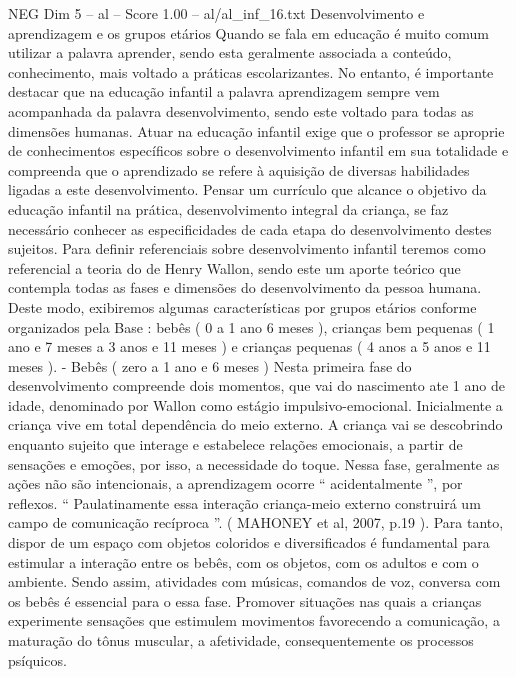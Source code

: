 \begin{textsample}{NEG Dim 5 – al – Score 1.00 – al/al\_inf\_16.txt}  \label{ex:f5_neg_249}
Desenvolvimento e aprendizagem e os grupos etários Quando se fala em educação é muito comum utilizar a palavra aprender, sendo esta geralmente associada a conteúdo, conhecimento, mais voltado a práticas escolarizantes.
No entanto, é importante destacar que na educação infantil a palavra aprendizagem sempre vem acompanhada da palavra desenvolvimento, sendo este voltado para todas as dimensões humanas.
Atuar na educação infantil exige que o professor se aproprie de conhecimentos específicos sobre o desenvolvimento infantil em sua totalidade e compreenda que o aprendizado se refere à aquisição de diversas habilidades ligadas a este desenvolvimento.
Pensar um currículo que alcance o objetivo da educação infantil na prática, desenvolvimento integral da criança, se faz necessário conhecer as especificidades de cada etapa do desenvolvimento destes sujeitos.
Para definir referenciais sobre desenvolvimento infantil teremos como referencial a teoria do de Henry Wallon, sendo este um aporte teórico que contempla todas as fases e dimensões do desenvolvimento da pessoa humana.
Deste modo, exibiremos algumas características por grupos etários conforme organizados pela Base : bebês ( 0 a 1 ano 6 meses ), crianças bem pequenas ( 1 ano e 7 meses a 3 anos e 11 meses ) e crianças pequenas ( 4 anos a 5 anos e 11 meses ). - Bebês ( zero a 1 ano e 6 meses ) Nesta primeira fase do desenvolvimento compreende dois momentos, que vai do nascimento ate 1 ano de idade, denominado por Wallon como estágio impulsivo-emocional.
Inicialmente a criança vive em total dependência do meio externo.
A criança vai se descobrindo enquanto sujeito que interage e estabelece relações emocionais, a partir de sensações e emoções, por isso, a necessidade do toque.
Nessa fase, geralmente as ações não são intencionais, a aprendizagem ocorre “ acidentalmente ”, por reflexos. “ Paulatinamente essa interação criança-meio externo construirá um campo de comunicação recíproca ”. ( MAHONEY et al, 2007, p.19 ).
Para tanto, dispor de um espaço com objetos coloridos e diversificados é fundamental para estimular a interação entre os bebês, com os objetos, com os adultos e com o ambiente.
Sendo assim, atividades com músicas, comandos de voz, conversa com os bebês é essencial para o essa fase.
Promover situações nas quais a crianças experimente sensações que estimulem movimentos favorecendo a comunicação, a maturação do tônus muscular, a afetividade, consequentemente os processos psíquicos.

\end{textsample}
